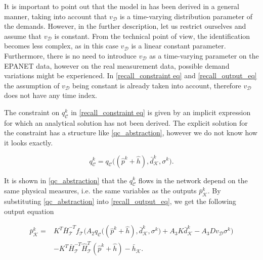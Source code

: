It is important to point out that the model in  has been derived in a general manner, taking into account that $v_{\mathcal{D}}$ is a time-varying distribution parameter of the demands. However, in the further description, let us restrict ourselves and assume that $v_{\mathcal{D}}$ is constant.  From the technical point of view, the identification becomes less complex, as in this case $v_{\mathcal{D}}$ is a linear constant parameter. Furthermore, there is no need to introduce $v_{\mathcal{D}}$ as a time-varying parameter on the EPANET data, however on the real measurement data, possible demand variations might be experienced. In \eqref{recall_constraint eq} and \eqref{recall_output_eq} the assumption of $v_{\mathcal{D}}$ being constant is already taken into account, therefore $v_{\mathcal{D}}$ does not have any time index.


The constraint on $q^{k}_{\mathcal{C}}$ in \eqref{recall_constraint eq} is given by an implicit expression for which an analytical solution has not been derived. The explicit solution for the constraint has a structure like \eqref{qc_abstraction}, however we do not know how it looks exactly.

 \begin{equation}
\label{qc_abstraction}
q^{k}_{\mathcal{C}} = q_{\mathcal{C}} \big( (\hat{p}^{k} + \hat{h}),\bar{d}^{k}_{\mathcal{K}}, \sigma^{k} \big).
\end{equation} 

It is shown in \eqref{qc_abstraction} that the $q^{k}_{\mathcal{C}}$ flows in the network depend on the same physical measures, i.e. the same variables as the outputs $\bar{p}^{k}_{\mathcal{K}}$. By substituting \eqref{qc_abstraction} into \eqref{recall_output_eq}, we get the following output equation

\vspace{-4mm}
\begin{align}
  \label{recall_output_eq_2}
      \bar{p}^{k}_{\mathcal{K}}  = & \nonumber K^T \bar{H}^{-T}_{\mathcal{T}}f_{\mathcal{T}} \big (A_2 q_{\mathcal{C}}\big ((\hat{p}^{k} + \hat{h}),\bar{d}^{k}_{\mathcal{K}}, \sigma^{k} \big) + A_3 K \bar{d}^{k}_{\mathcal{K}} - A_3 D v_{\mathcal{D}} \sigma^{k} \big)   \\ &  - K^T\bar{H}^{-T}_{\mathcal{T}}\hat{H}^{T}_{\mathcal{T}} (\hat{p}^{k} + \hat{h}) - \bar{h}_{\mathcal{K}} .
\end{align}

